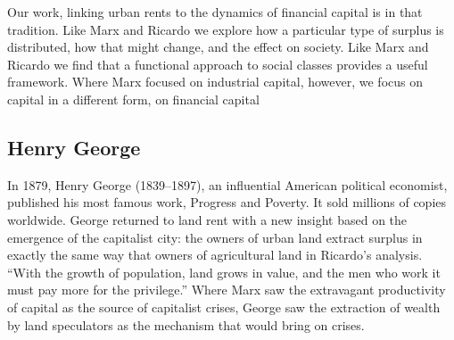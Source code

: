 Our work, linking urban rents to the dynamics of financial capital is in that tradition. Like Marx and Ricardo we explore how a particular type of surplus is distributed, how that might change, and the effect on society. Like Marx and Ricardo we find that a functional approach to social classes  provides  a useful framework. Where Marx focused on industrial \gls{capital}, however, we focus on capital in a different form, on \gls{financial capital}%

 
\subsection{Henry George} 
In 1879, Henry George (1839--1897), an influential American political economist, published his most famous work, Progress and Poverty\cite{georgeProgressPovertyInquiry1973}. It sold millions of copies worldwide. George returned to land rent with a new insight based on the emergence of the capitalist city: the owners of urban land extract surplus in exactly the same way that owners of agricultural land in Ricardo's analysis. ``With the growth of population, land grows in value, and the men who work it must pay more for the privilege.''  Where Marx saw the extravagant productivity of capital as the source of capitalist crises, George saw the extraction of wealth by land speculators as the mechanism that would bring on crises.
  
